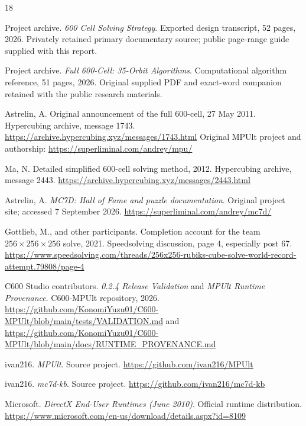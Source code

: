 \documentclass[a4paper,11pt]{article}
\begin{document}
\begingroup
\small
\begin{thebibliography}{18}
\setlength{\itemsep}{2pt}
\setlength{\parskip}{0pt}

Project archive. \emph{600 Cell Solving Strategy}. Exported design transcript, 52 pages, 2026. Privately retained primary documentary source; public page-range guide supplied with this report.

Project archive. \emph{Full 600-Cell: 35-Orbit Algorithms}. Computational algorithm reference, 51 pages, 2026. Original supplied PDF and exact-word companion retained with the public research materials.

Astrelin, A. Original announcement of the full 600-cell, 27 May 2011. Hypercubing archive, message 1743. \url{https://archive.hypercubing.xyz/messages/1743.html} Original MPUlt project and authorship: \url{https://superliminal.com/andrey/mpu/}

Ma, N. Detailed simplified 600-cell solving method, 2012. Hypercubing archive, message 2443. \url{https://archive.hypercubing.xyz/messages/2443.html}

Astrelin, A. \emph{MC7D: Hall of Fame and puzzle documentation}. Original project site; accessed 7 September 2026. \url{https://superliminal.com/andrey/mc7d/}

Gottlieb, M., and other participants. Completion account for the team \(256\times256\times256\) solve, 2021. Speedsolving discussion, page 4, especially post 67. \url{https://www.speedsolving.com/threads/256x256-rubiks-cube-solve-world-record-attempt.79808/page-4}

C600 Studio contributors. \emph{0.2.4 Release Validation} and \emph{MPUlt Runtime Provenance}. C600-MPUlt repository, 2026. \url{https://github.com/KonomiYuzu01/C600-MPUlt/blob/main/tests/VALIDATION.md} and \url{https://github.com/KonomiYuzu01/C600-MPUlt/blob/main/docs/RUNTIME_PROVENANCE.md}

ivan216. \emph{MPUlt}. Source project. \url{https://github.com/ivan216/MPUlt}

ivan216. \emph{mc7d-kb}. Source project. \url{https://github.com/ivan216/mc7d-kb}

Microsoft. \emph{DirectX End-User Runtimes (June 2010)}. Official runtime distribution. \url{https://www.microsoft.com/en-us/download/details.aspx?id=8109}



\end{thebibliography}
\end{document}
